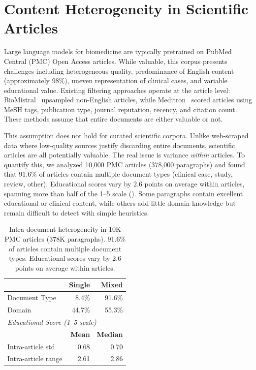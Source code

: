 \section{Content Heterogeneity in Scientific Articles}
\label{sec:heterogeneity}

\begin{reviewread}
Large language models for biomedicine are typically pretrained on PubMed Central (PMC) Open Access articles. While valuable, this corpus presents challenges including heterogeneous quality, predominance of English content (approximately 98\%), uneven representation of clinical cases, and variable educational value. Existing filtering approaches operate at the article level: BioMistral~\citep{labrak-etal-2024-biomistral} upsampled non-English articles, while Meditron~\citep{chen2023meditron} scored articles using MeSH tags, publication type, journal reputation, recency, and citation count. These methods assume that entire documents are either valuable or not.
\end{reviewread}

\begin{reviewread}
This assumption does not hold for curated scientific corpora. Unlike web-scraped data where low-quality sources justify discarding entire documents, scientific articles are all potentially valuable. The real issue is variance \emph{within} articles. To quantify this, we analyzed 10,000 PMC articles (378,000 paragraphs) and found that 91.6\% of articles contain multiple document types (clinical case, study, review, other). Educational scores vary by 2.6 points on average within articles, spanning more than half of the 1--5 scale (). Some paragraphs contain excellent educational or clinical content, while others add little domain knowledge but remain difficult to detect with simple heuristics.
\end{reviewread}

\begin{table}[t]
\centering
\small
\begin{tabular}{lrr}
\toprule
& \textbf{Single} & \textbf{Mixed} \\
\midrule
Document Type & 8.4\% & 91.6\% \\
Domain & 44.7\% & 55.3\% \\
\midrule
\multicolumn{3}{l}{\textit{Educational Score (1--5 scale)}} \\
\midrule
& \textbf{Mean} & \textbf{Median} \\
Intra-article std & 0.68 & 0.70 \\
Intra-article range & 2.61 & 2.86 \\
\bottomrule
\end{tabular}
\caption{Intra-document heterogeneity in 10K PMC articles (378K paragraphs). 91.6\% of articles contain multiple document types. Educational scores vary by 2.6 points on average within articles.}
\label{tab:heterogeneity}
\end{table}


